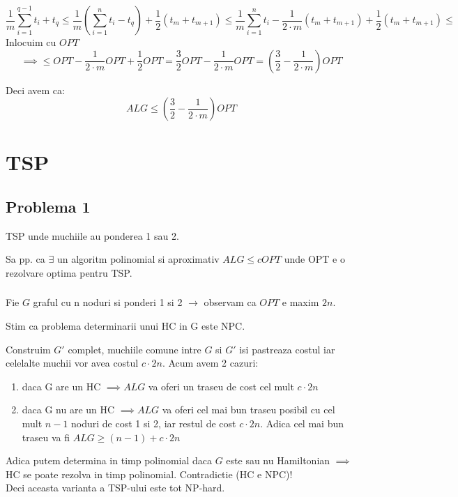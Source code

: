 \documentclass[a4paper]{report} %
\begin{document}
\[\frac{1}{m}\sum_{i=1}^{q-1}t_{i} + t_{q} \leq \frac{1}{m}(\sum_{i=1}^{n}t_{i} - t_{q}) + \frac{1}{2}(t_{m}+t_{m+1})\leq \frac{1}{m}\sum_{i=1}^{n}t_{i}-\frac{1}{2\cdot m}(t_{m}+t_{m+1})+\frac{1}{2}(t_{m}+t_{m+1})\leq\]
Inlocuim cu $OPT$
\[\implies \leq OPT-\frac{1}{2\cdot m}OPT + \frac{1}{2}OPT = \frac{3}{2}OPT - \frac{1}{2\cdot m}OPT = (\frac{3}{2}-\frac{1}{2\cdot m})OPT\]

Deci avem ca:\[ALG\leq (\frac{3}{2}-\frac{1}{2\cdot m})OPT\]

\chapter*{TSP}
\setcounter{section}{0}
\section{Problema 1}
TSP unde muchiile au ponderea 1 sau 2. 

Sa pp. ca $\exists$ un algoritm polinomial si aproximativ $ALG\leq cOPT$ unde OPT e o rezolvare optima pentru TSP.

\subsection{}

Fie $G$ graful cu n noduri si ponderi 1 si 2 $\rightarrow$ observam ca $OPT$ e maxim $2n$.

Stim ca problema determinarii unui HC in G este NPC.

Construim $G'$ complet, muchiile comune intre $G$ si $G'$ isi pastreaza costul iar celelalte muchii vor avea costul $c\cdot 2n$. Acum avem 2 cazuri:

\begin{enumerate}
    \item daca G are un HC $\implies ALG$ va oferi un traseu de cost cel mult $c\cdot 2n$
    \item daca G nu are un HC $\implies ALG$ va oferi cel mai bun traseu posibil cu cel mult $n-1$ noduri de cost 1 si 2, iar restul de cost $c\cdot 2n$.
        Adica cel mai bun traseu va fi $ALG \geq (n-1) + c\cdot 2n$
\end{enumerate}

Adica putem determina in timp polinomial daca $G$ este sau nu Hamiltonian $\implies$ HC se poate rezolva in timp polinomial. Contradictie (HC e NPC)!\\

Deci aceasta varianta a TSP-ului este tot NP-hard.
\end{document}
